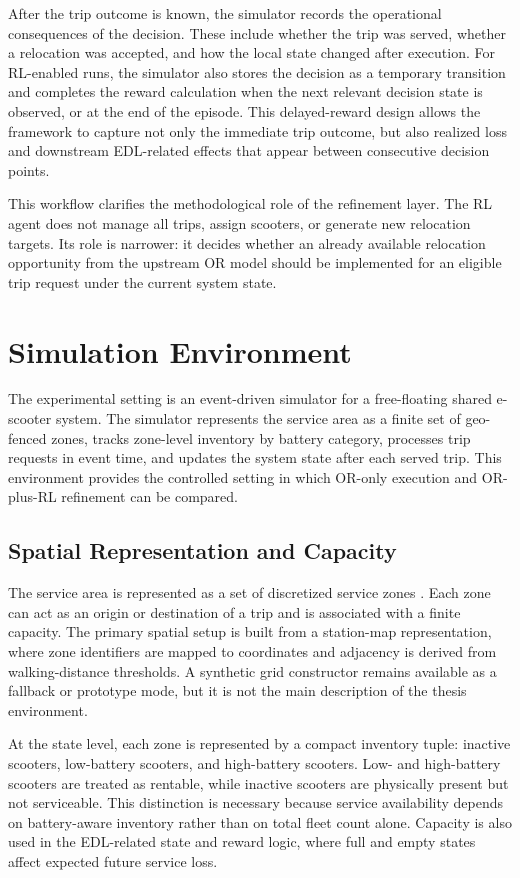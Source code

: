 After the trip outcome is known, the simulator records the operational consequences of the decision. These include whether the trip was served, whether a relocation was accepted, and how the local state changed after execution. For RL-enabled runs, the simulator also stores the decision as a temporary transition and completes the reward calculation when the next relevant decision state is observed, or at the end of the episode. This delayed-reward design allows the framework to capture not only the immediate trip outcome, but also realized loss and downstream EDL-related effects that appear between consecutive decision points.

This workflow clarifies the methodological role of the refinement layer. The RL agent does not manage all trips, assign scooters, or generate new relocation targets. Its role is narrower: it decides whether an already available relocation opportunity from the upstream OR model should be implemented for an eligible trip request under the current system state.


\section{Simulation Environment}

The experimental setting is an event-driven simulator for a free-floating shared e-scooter system. The simulator represents the service area as a finite set of geo-fenced zones, tracks zone-level inventory by battery category, processes trip requests in event time, and updates the system state after each served trip. This environment provides the controlled setting in which OR-only execution and OR-plus-RL refinement can be compared.

\subsection{Spatial Representation and Capacity}

The service area is represented as a set of discretized service zones \parencite{momen2025}. Each zone can act as an origin or destination of a trip and is associated with a finite capacity. The primary spatial setup is built from a station-map representation, where zone identifiers are mapped to coordinates and adjacency is derived from walking-distance thresholds. A synthetic grid constructor remains available as a fallback or prototype mode, but it is not the main description of the thesis environment.

At the state level, each zone is represented by a compact inventory tuple: inactive scooters, low-battery scooters, and high-battery scooters. Low- and high-battery scooters are treated as rentable, while inactive scooters are physically present but not serviceable. This distinction is necessary because service availability depends on battery-aware inventory rather than on total fleet count alone. Capacity is also used in the EDL-related state and reward logic, where full and empty states affect expected future service loss.

